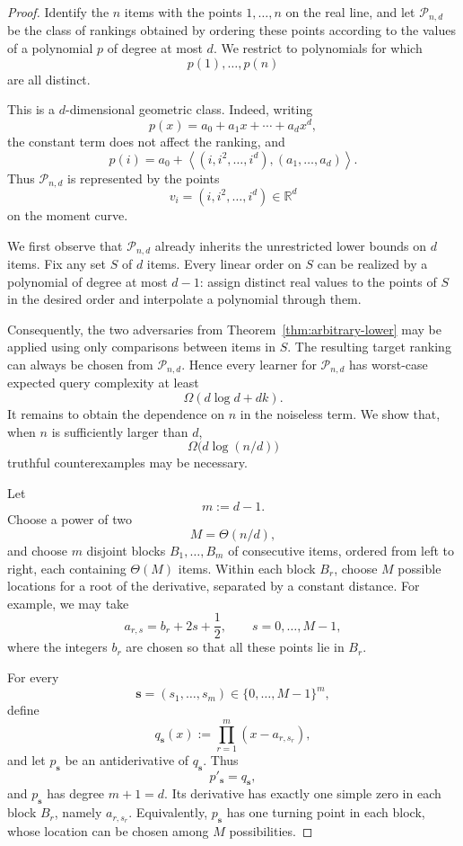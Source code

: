 \documentclass[11pt]{article}
\theoremstyle{definition}
\theoremstyle{remark}
\begin{document}
\begin{proof}
Identify the $n$ items with the points $1,\ldots,n$ on the real line, and
let $\mathcal P_{n,d}$ be the class of rankings obtained by ordering these
points according to the values of a polynomial $p$ of degree at most $d$.
We restrict to polynomials for which
\[
    p(1),\ldots,p(n)
\]
are all distinct.

This is a $d$-dimensional geometric class. Indeed, writing
\[
    p(x)=a_0+a_1x+\cdots+a_dx^d,
\]
the constant term does not affect the ranking, and
\[
    p(i)
    =
    a_0+
    \left\langle
        (i,i^2,\ldots,i^d),
        (a_1,\ldots,a_d)
    \right\rangle.
\]
Thus $\mathcal P_{n,d}$ is represented by the points
\[
    v_i=(i,i^2,\ldots,i^d)\in\mathbb R^d
\]
on the moment curve.

We first observe that $\mathcal P_{n,d}$ already inherits the unrestricted
lower bounds on $d$ items. Fix any set $S$ of $d$ items. Every linear order
on $S$ can be realized by a polynomial of degree at most $d-1$: assign
distinct real values to the points of $S$ in the desired order and
interpolate a polynomial through them. 

Consequently, the two adversaries from
Theorem~\ref{thm:arbitrary-lower} may be applied using only comparisons
between items in $S$. The resulting target ranking can always be chosen
from $\mathcal P_{n,d}$. Hence every learner for $\mathcal P_{n,d}$ has
worst-case expected query complexity at least
\[
    \Omega(d\log d+dk).
    \tag{23}\label{eq:geometric-lower-first}
\]
It remains to obtain the dependence on $n$ in the noiseless term. We show
that, when $n$ is sufficiently larger than $d$,
\[
    \Omega\bigl(d\log(n/d)\bigr)
    \tag{24}\label{eq:geometric-lower-second}
\]
truthful counterexamples may be necessary.

Let
\[
    m:=d-1.
\]
Choose a power of two
\[
    M=\Theta(n/d),
\]
and choose $m$ disjoint blocks
$B_1,\ldots,B_m$ of consecutive items, ordered from left to right, each
containing $\Theta(M)$ items. Within each block $B_r$, choose $M$ possible
locations for a root of the derivative, separated by a constant distance.
For example, we may take
\[
    a_{r,s}=b_r+2s+\frac12,
    \qquad s=0,\ldots,M-1,
\]
where the integers $b_r$ are chosen so that all these points lie in $B_r$.

For every
\[
    \mathbf{s}=(s_1,\ldots,s_m)\in\{0,\ldots,M-1\}^m,
\]
define
\[
    q_{\mathbf{s}}(x)
    :=
    \prod_{r=1}^m (x-a_{r,s_r}),
\]
and let $p_{\mathbf{s}}$ be an antiderivative of $q_{\mathbf{s}}$. Thus
\[
    p'_{\mathbf{s}}=q_{\mathbf{s}},
\]
and $p_{\mathbf{s}}$ has degree $m+1=d$. Its derivative has exactly one
simple zero in each block $B_r$, namely $a_{r,s_r}$. Equivalently,
$p_{\mathbf{s}}$ has one turning point in each block, whose location can be
chosen among $M$ possibilities.


\end{proof}
\end{document}
